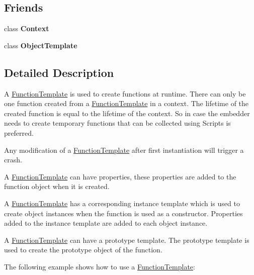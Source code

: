 \subsection*{Friends}
\begin{DoxyCompactItemize}
\item 
\mbox{\label{classv8_1_1FunctionTemplate_ac26c806e60ca4a0547680edb68f6e39b}} 
class {\bfseries Context}
\item 
\mbox{\label{classv8_1_1FunctionTemplate_a4d28646409234f556983be8a96c06424}} 
class {\bfseries Object\+Template}
\end{DoxyCompactItemize}


\subsection{Detailed Description}
A \mbox{\hyperlink{classv8_1_1FunctionTemplate}{Function\+Template}} is used to create functions at runtime. There can only be one function created from a \mbox{\hyperlink{classv8_1_1FunctionTemplate}{Function\+Template}} in a context. The lifetime of the created function is equal to the lifetime of the context. So in case the embedder needs to create temporary functions that can be collected using Scripts is preferred.

Any modification of a \mbox{\hyperlink{classv8_1_1FunctionTemplate}{Function\+Template}} after first instantiation will trigger a crash.

A \mbox{\hyperlink{classv8_1_1FunctionTemplate}{Function\+Template}} can have properties, these properties are added to the function object when it is created.

A \mbox{\hyperlink{classv8_1_1FunctionTemplate}{Function\+Template}} has a corresponding instance template which is used to create object instances when the function is used as a constructor. Properties added to the instance template are added to each object instance.

A \mbox{\hyperlink{classv8_1_1FunctionTemplate}{Function\+Template}} can have a prototype template. The prototype template is used to create the prototype object of the function.

The following example shows how to use a \mbox{\hyperlink{classv8_1_1FunctionTemplate}{Function\+Template}}\+:



